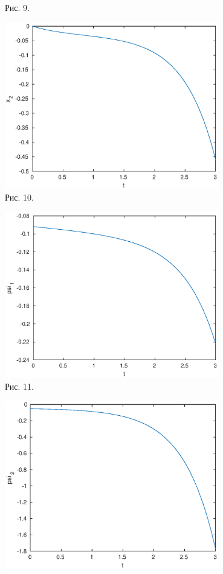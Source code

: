 \documentclass[11pt]{article}
\begin{document}
{{\begin{center}
	{Рис. 9. }
\end{center}
\begin{center}
	\includegraphics[width=0.7\textwidth]{x2t_1.eps}\\
	{Рис. 10. }
\end{center}
\begin{center}
	\includegraphics[width=0.7\textwidth]{psi1_1.eps}\\
	{Рис. 11. }
\end{center}
\begin{center}
	\includegraphics[width=0.7\textwidth]{psi2_1.eps}\\

\end{center}}}
\end{document}

